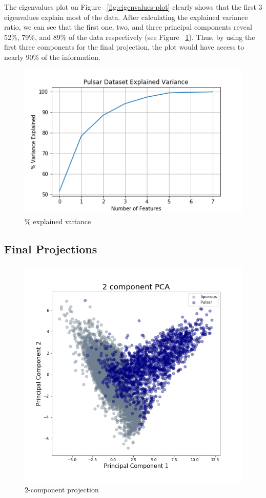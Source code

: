 \documentclass[a4paper,12pt]{article}
\begin{document}
    \newpage

    The eigenvalues plot on Figure ~\ref{fig:eigenvalues-plot} clearly shows that the first 3 eigenvalues explain most of the data. After calculating the explained variance ratio, we can see that the first one, two, and three principal components reveal 52\%, 79\%, and 89\% of the data respectively (see Figure ~\ref{fig:eigenvalues-plot-percent}). Thus, by using the first three components for the final projection, the plot would have access to nearly 90\% of the information.

    \begin{figure}[ht!]
        \centering
        \includegraphics[width=.75\textwidth]{eigen-percent}
        \caption{\% explained variance}
        \label{fig:eigenvalues-plot-percent}
    \end{figure}

    \newpage

    \subsection{Final Projections}

    \begin{figure}[ht!]
        \centering
        \includegraphics[clip, trim = 0 1cm 0 1.7cm, height=.61\textwidth]{2component-projection}
        \caption{2-component projection}
    \end{figure}
\end{document}
